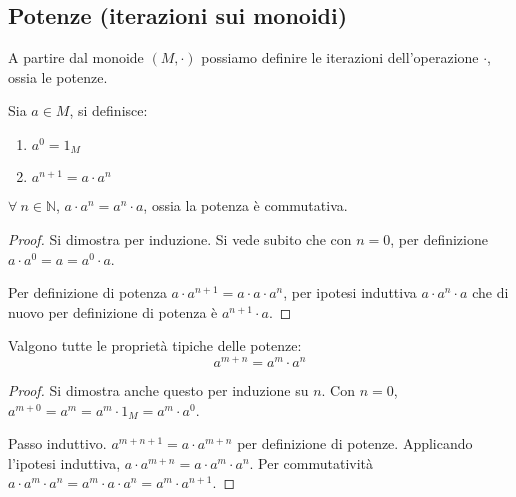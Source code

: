 \subsection{Potenze (iterazioni sui monoidi)}

\begin{defn}[Potenze]
A partire dal monoide $(M, \cdot)$ possiamo definire le iterazioni dell'operazione $\cdot$, ossia le potenze.

Sia $ a \in M$, si definisce:
\begin{enumerate}
    \item $a^0 = 1_M$
    \item $a^{n+1} = a \cdot a^{n}$
\end{enumerate}
\end{defn}
\begin{prop}
$\forall \ n \in \mathbb{N}$, $a \cdot a^n = a^n \cdot a$, ossia la potenza \`e commutativa.
\end{prop}
\begin{proof}
Si dimostra per induzione. Si vede subito che con $n = 0$, per definizione $a \cdot a^0 = a = a^0 \cdot a$.

Per definizione di potenza $a \cdot a^{n+1} = a \cdot a \cdot a^{n} $, per ipotesi induttiva $ a \cdot a^n \cdot a $ che di nuovo per definizione di potenza \`e $ a^{n+1} \cdot a$.
\end{proof}
\begin{prop}
Valgono tutte le propriet\`a tipiche delle potenze:
\[
a^{m + n} = a^m \cdot a^n
\]
\end{prop}
\begin{proof}
Si dimostra anche questo per induzione su $n$. Con $n = 0$, $a^{m+0} = a^m = a^m \cdot 1_M = a^m \cdot a^0$.

Passo induttivo. $a^{m + n + 1} = a \cdot a^{m + n}$ per definizione di potenze. Applicando l'ipotesi induttiva, $a \cdot a^{m + n} = a \cdot a^m \cdot a^n$. Per commutativit\`a $a \cdot a^m \cdot a^n = a^m \cdot a \cdot a^n = a^m \cdot a^{n+1}$.
\end{proof}

